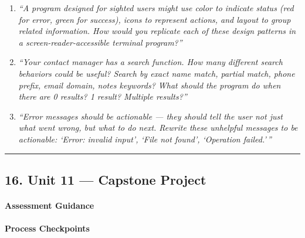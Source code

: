 \documentclass[
  justified,
  openright,
]{tufte-book}
\let\subsubsection\paragraph
\let\paragraph\paragraph
\let\subsubsection\paragraph
\let\paragraph\paragraph
\begin{document}
\begin{enumerate}
\def\labelenumi{\arabic{enumi}.}
\item
  \emph{``A program designed for sighted users might use color to
  indicate status (red for error, green for success), icons to represent
  actions, and layout to group related information. How would you
  replicate each of these design patterns in a screen-reader-accessible
  terminal program?''}
\item
  \emph{``Your contact manager has a search function. How many different
  search behaviors could be useful? Search by exact name match, partial
  match, phone prefix, email domain, notes keywords? What should the
  program do when there are 0 results? 1 result? Multiple results?''}
\item
  \emph{``Error messages should be actionable --- they should tell the
  user not just what went wrong, but what to do next. Rewrite these
  unhelpful messages to be actionable: `Error: invalid input', `File not
  found', `Operation failed.'\,''}
\end{enumerate}

\begin{center}\rule{0.5\linewidth}{0.5pt}\end{center}

\subsection{16. Unit 11 --- Capstone
Project}\label{unit-11-capstone-project}

\subsubsection{Assessment Guidance}\label{assessment-guidance}

\paragraph{Process Checkpoints}\label{process-checkpoints}
\end{document}
